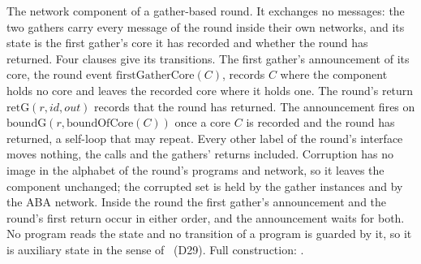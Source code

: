 \begin{definition}
  \label{def:aba-gbca-network}
  \leanok
  The network component of a gather-based round.
  It exchanges no messages: the two gathers carry every message of the round inside their own networks, and its state is the first gather's core it has recorded and whether the round has returned.
  Four clauses give its transitions.
  The first gather's announcement of its core, the round event $\mathrm{firstGatherCore}(C)$, records $C$ where the component holds no core and leaves the recorded core where it holds one.
  The round's return $\mathrm{retG}(r,id,out)$ records that the round has returned.
  The announcement  fires on $\mathrm{boundG}(r,\mathrm{boundOfCore}(C))$ once a core $C$ is recorded and the round has returned, a self-loop that may repeat.
  Every other label of the round's interface moves nothing, the calls and the gathers' returns included.
  Corruption has no image in the alphabet of the round's programs and network, so it leaves the component unchanged; the corrupted set is held by the gather instances and by the ABA network.
  Inside the round the first gather's announcement and the round's first return occur in either order, and the announcement waits for both.
  No program reads the state and no transition of a program is guarded by it, so it is auxiliary state in the sense of~\cite{AL91} (D29).
  Full construction: .
\end{definition}
